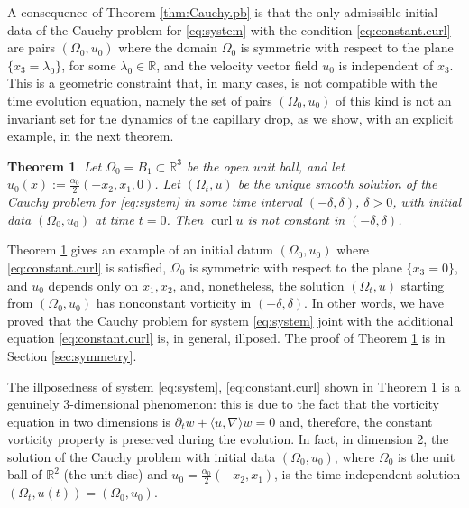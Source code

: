\documentclass[10pt,reqno,a4paper]{article}
\numberwithin{equation}{section}
\theoremstyle{plain}
\newtheorem{theorem}{Theorem}[section]
\theoremstyle{definition}
\newenvironment{remark}{\pushQED{\qed} \remarkbase}{\popQED\endremarkbase}
\newcommand{\R}{{\mathbb R}}
\renewcommand{\a}{\alpha}
\newcommand{\lm}{\lambda}
\newcommand{\Om}{\Omega}
\newcommand{\la}{\langle}
\newcommand{\ra}{\rangle}
\newcommand{\pa}{\partial}
\newcommand{\grad}{\nabla}
\newcommand{\curl}{\operatorname{curl}}
\begin{document}
A consequence of Theorem \ref{thm:Cauchy.pb} is that the only admissible initial data 
of the Cauchy problem for \eqref{eq:system} with the condition \eqref{eq:constant.curl} 
are pairs $(\Om_0, u_0)$ where 
the domain $\Om_0$ is symmetric with respect to the plane $\{ x_3 = \lm_0 \}$, for some $\lm_0 \in \R$, 
and the velocity vector field $u_0$ is independent of $x_3$. 
This is a geometric constraint that, in many cases, is not compatible with the time evolution equation, 
namely the set of pairs $(\Om_0,u_0)$ of this kind 
is not an invariant set for the dynamics of the capillary drop,  
as we show, with an explicit example, in the next theorem. 

\begin{theorem} \label{thm:not.invariant.subset}  
Let $\Omega_0 = B_1 \subset \R^3$ be the open unit ball, 
and let $u_0(x) := \frac{\a_0}{2} (-x_2, x_1, 0)$.
Let $(\Omega_t, u)$ be the unique smooth solution of the Cauchy problem for \eqref{eq:system} 
in some time interval $(-\delta, \delta)$, $\delta>0$, 
with initial data $(\Om_0, u_0)$ at time $t=0$. 
Then $\curl u$ is not constant in $(-\delta, \delta)$. 
\end{theorem}

Theorem \ref{thm:not.invariant.subset} gives an example of an initial datum $(\Om_0, u_0)$ 
where \eqref{eq:constant.curl} is satisfied, 
$\Om_0$ is symmetric with respect to the plane $\{ x_3 = 0 \}$, 
and $u_0$ depends only on $x_1, x_2$, 
and, nonetheless, the solution $(\Om_t, u)$ starting from $(\Om_0, u_0)$ 
has nonconstant vorticity in $(-\delta, \delta)$. 
In other words, we have proved that the Cauchy problem for system \eqref{eq:system} 
joint with the additional equation \eqref{eq:constant.curl} is, in general, illposed. 
The proof of Theorem \ref{thm:not.invariant.subset} is in Section \ref{sec:symmetry}.

\begin{remark}[\emph{Illposedness is a 3-dimensional phenomenon}] \label{rem:2D.3D} 
The illposedness of system \eqref{eq:system}, \eqref{eq:constant.curl} 
shown in Theorem \ref{thm:not.invariant.subset} is a genuinely 3-dimensional phenomenon:
this is due to the fact that the vorticity equation in two dimensions is 
$\pa_t w + \la u , \grad \ra w =0$
and, therefore, the constant vorticity property is preserved during the evolution.  
In fact, in dimension 2, the solution of the Cauchy problem with initial data $(\Om_0, u_0)$, 
where $\Om_0$ is the unit ball of $\R^2$ (the unit disc) and $u_0 = \frac{\a_0}{2} (-x_2, x_1)$, 
is the time-independent solution $(\Om_t,u(t)) = (\Om_0, u_0)$. 
\end{remark} 
\end{document}
